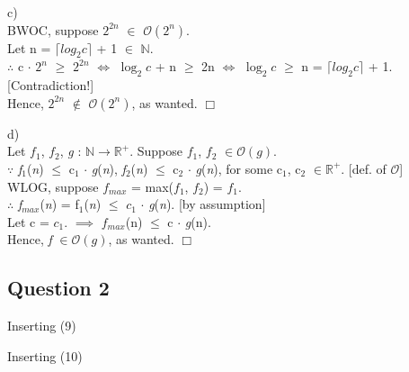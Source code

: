 \documentclass[fleqn]{article}
\newcommand{\bigo}[1]{\mathcal{O}(#1)}
\newcommand{\ital}{\itshape{}}
\begin{document}
\noindent
c) \\
BWOC, suppose $2^{2n}$ $\in$ $\bigo{2^n}$. \\
Let n = $\lceil{log_2{c}}\rceil$ + 1 $\in$ $\mathbb{N}$. \\

\noindent $\therefore$
c $\cdot$ $2^n$ $\geq$ $2^{2n}$ $\Leftrightarrow$ 
$\log_2{c}$ + n $\geq$ 2n $\Leftrightarrow$
$\log_2{c}$ $\geq$ n = $\lceil{log_2{c}}\rceil$ + 1.
[Contradiction!] \\

\noindent
Hence, $2^{2n}$ $\notin$ $\bigo{2^n}$, as wanted. $\Box$ \pagebreak

\noindent
d) \\
Let {\itshape $f_1$}, {\itshape $f_2$}, {\itshape g} : 
$\mathbb{N} \rightarrow \mathbb{R^+}$.
Suppose {\itshape $f_1$}, {\itshape $f_2$} $\in \bigo{g}$. \\

\noindent $\because$ 
{\itshape f$_1$}({\ital n}) $\leq$ c$_{1}$ $\cdot$ {\itshape g}({\ital n}),
{\itshape f$_2$}({\ital n}) $\leq$ c$_{2}$ $\cdot$ {\itshape g}({\ital n}),
for some c$_{1}$, c$_{2}$ $\in \mathbb{R^{+}}$. [def. of $\mathcal{O}$] \\

\noindent
WLOG, suppose $f_{max}$ = max($f_1$, $f_2$) = $f_1$. \\

\noindent $\therefore$
{\ital f$_{max}$}({\ital n}) = f$_{1}$({\ital n}) $\leq$
$c_1$ $\cdot$ {\ital g}({\ital n}).
[by assumption] \\

\noindent
Let c = $c_1$.
$\implies$ {\ital $f_{max}$}(n) $\leq$ c $\cdot$ {\ital g}(n). \\
Hence, {\ital f} $\in \bigo{g}$, as wanted. $\Box$ \pagebreak

\subsection*{Question 2}

Inserting (9) \\

\begin{center}
\end{center}

\noindent
Inserting (10) \\

\begin{center}
\end{center}
\end{document}
